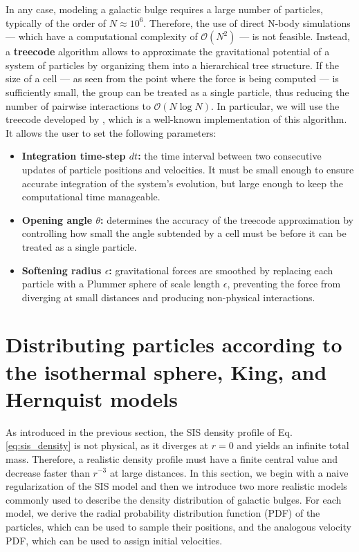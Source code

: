 \documentclass[fleqn,usenatbib]{mnras}
\begin{document}
In any case, modeling a galactic bulge requires a large number of particles, typically of the order of $N \approx 10^6$.
Therefore, the use of direct N-body simulations — which have a computational complexity of $\mathcal{O}(N^2)$ — is not feasible.
Instead, a \textbf{treecode} algorithm allows to approximate the gravitational potential of a system of particles by organizing them into a hierarchical tree structure.
If the size of a cell — as seen from the point where the force is being computed — is sufficiently small, the group can be treated as a single particle, thus reducing the number of pairwise interactions to $\mathcal{O}(N \log N)$.
In particular, we will use the treecode developed by \cite{Barnes1986}, which is a well-known implementation of this algorithm.
It allows the user to set the following parameters:
\begin{itemize}[wide, labelwidth=!, itemindent=!, labelindent=0pt, itemsep=0.1em]
  \item \textbf{Integration time-step $dt$:} the time interval between two consecutive updates of particle positions and velocities. It must be small enough to ensure accurate integration of the system's evolution, but large enough to keep the computational time manageable. 
  \item \textbf{Opening angle $\theta$:} determines the accuracy of the treecode approximation by controlling how small the angle subtended by a cell must be before it can be treated as a single particle.
  \item \textbf{Softening radius $\epsilon$:} gravitational forces are smoothed by replacing each particle with a Plummer sphere of scale length $\epsilon$, preventing the force from diverging at small distances and producing non-physical interactions. 
\end{itemize}


\section{Distributing particles according to the isothermal sphere, King, and Hernquist models}\label{sec:observation}
As introduced in the previous section, the SIS density profile of Eq. \ref{eq:sis_density} is not physical, as it diverges at $r=0$ and yields an infinite total mass.
Therefore, a realistic density profile must have a finite central value and decrease faster than $r^{-3}$ at large distances.
In this section, we begin with a naive regularization of the SIS model and then we introduce two more realistic models commonly used to describe the density distribution of galactic bulges.
For each model, we derive the radial probability distribution function (PDF) of the particles, which can be used to sample their positions, and the analogous velocity PDF, which can be used to assign initial velocities.
\vspace{0.5em}
\end{document}
